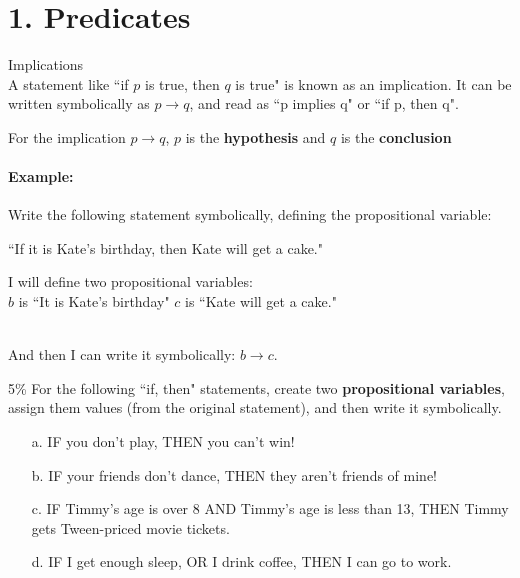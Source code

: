 \documentclass[a4paper,12pt]{book}
\title{}
\author{Rachel Morris}
\date{\today}
\begin{document}
    \togglefalse{answerkey}
    

    \section*{1. Predicates}

        \begin{intro}{Implications} ~\\
            A statement like ``if $p$ is true, then $q$ is true" is known
            as an implication. It can be written symbolically as $p \to q$,
            and read as ``p implies q" or ``if p, then q".

            For the implication $p \to q$, $p$ is the \textbf{hypothesis}
            and $q$ is the \textbf{conclusion}

            \paragraph{Example:} Write the following statement symbolically,
                defining the propositional variable:
                \begin{center} ``If it is Kate's birthday, then Kate will get a cake." \end{center}

                I will define two propositional variables: ~\\
                $b$ is ``It is Kate's birthday" \tab $c$ is ``Kate will get a cake."

                ~\\
                And then I can write it symbolically: $b \to c$.
        \end{intro}

        \begin{question}{1}{5\%}
            For the following ``if, then" statements, create two
            \textbf{propositional variables}, assign them values (from
            the original statement), and then write it symbolically.

            \begin{enumerate}
                \item[a.] IF you don't play, THEN you can't win!
                \item[b.] IF your friends don't dance, THEN they aren't friends of mine!
                \item[c.] IF Timmy's age is over 8 AND Timmy's age is less than 13, THEN Timmy gets Tween-priced movie tickets.
                \item[d.] IF I get enough sleep, OR I drink coffee, THEN I can go to work.
            \end{enumerate}
        \end{question}
\end{document}
